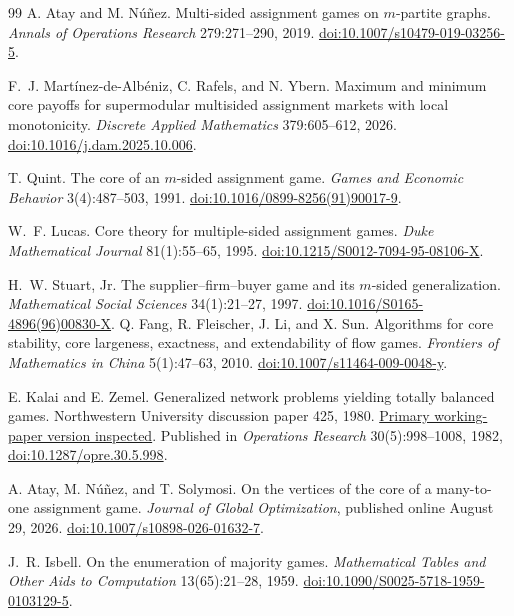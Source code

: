 \documentclass[11pt]{article}
\theoremstyle{remark}
\begin{document}
\begin{thebibliography}{99}
A. Atay and M. N\'u\~nez.
Multi-sided assignment games on $m$-partite graphs.
\emph{Annals of Operations Research} 279:271--290, 2019.
\href{https://doi.org/10.1007/s10479-019-03256-5}{doi:10.1007/s10479-019-03256-5}.

F.~J. Mart\'inez-de-Alb\'eniz, C. Rafels, and N. Ybern.
Maximum and minimum core payoffs for supermodular multisided assignment
markets with local monotonicity.
\emph{Discrete Applied Mathematics} 379:605--612, 2026.
\href{https://doi.org/10.1016/j.dam.2025.10.006}{doi:10.1016/j.dam.2025.10.006}.

T. Quint. The core of an $m$-sided assignment game.
\emph{Games and Economic Behavior} 3(4):487--503, 1991.
\href{https://doi.org/10.1016/0899-8256(91)90017-9}{doi:10.1016/0899-8256(91)90017-9}.

W.~F. Lucas. Core theory for multiple-sided assignment games.
\emph{Duke Mathematical Journal} 81(1):55--65, 1995.
\href{https://doi.org/10.1215/S0012-7094-95-08106-X}{doi:10.1215/S0012-7094-95-08106-X}.

H.~W. Stuart, Jr. The supplier--firm--buyer game and its $m$-sided generalization.
\emph{Mathematical Social Sciences} 34(1):21--27, 1997.
\href{https://doi.org/10.1016/S0165-4896(96)00830-X}{doi:10.1016/S0165-4896(96)00830-X}.
Q. Fang, R. Fleischer, J. Li, and X. Sun.
Algorithms for core stability, core largeness, exactness, and extendability
of flow games.
\emph{Frontiers of Mathematics in China} 5(1):47--63, 2010.
\href{https://doi.org/10.1007/s11464-009-0048-y}{doi:10.1007/s11464-009-0048-y}.

E. Kalai and E. Zemel.
Generalized network problems yielding totally balanced games.
Northwestern University discussion paper 425, 1980.
\href{https://www.econstor.eu/bitstream/10419/220785/1/cmsems-dp0425.pdf}{Primary working-paper version inspected}.
Published in \emph{Operations Research} 30(5):998--1008, 1982,
\href{https://doi.org/10.1287/opre.30.5.998}{doi:10.1287/opre.30.5.998}.

A. Atay, M. N\'u\~nez, and T. Solymosi.
On the vertices of the core of a many-to-one assignment game.
\emph{Journal of Global Optimization}, published online August 29, 2026.
\href{https://doi.org/10.1007/s10898-026-01632-7}{doi:10.1007/s10898-026-01632-7}.

J.~R. Isbell.
On the enumeration of majority games.
\emph{Mathematical Tables and Other Aids to Computation}
13(65):21--28, 1959.
\href{https://doi.org/10.1090/S0025-5718-1959-0103129-5}{doi:10.1090/S0025-5718-1959-0103129-5}.


\end{thebibliography}
\end{document}
